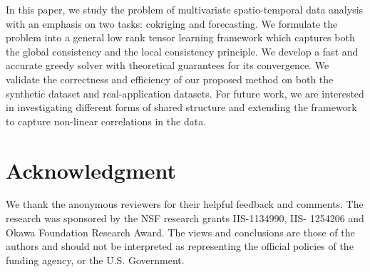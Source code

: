 In this paper, we study the problem of multivariate spatio-temporal data analysis with an emphasis on two tasks: cokriging and forecasting.  We formulate the problem into a general low rank tensor learning framework which captures both the global consistency and the local consistency principle. We develop a fast and accurate greedy solver with theoretical guarantees for its convergence. We validate the correctness and efficiency of our proposed method on both the synthetic dataset and real-application datasets. For future work, we are interested in investigating different forms of shared structure and extending the framework to capture non-linear correlations in the data.
\vspace{-0.1in}
\section*{Acknowledgment}
We thank the anonymous reviewers for their helpful feedback and comments. The research was sponsored by the NSF research grants IIS-1134990, IIS- 1254206 and Okawa Foundation Research Award. The views and conclusions are those of the authors and should not be interpreted as representing the official policies of the funding agency, or the U.S. Government.